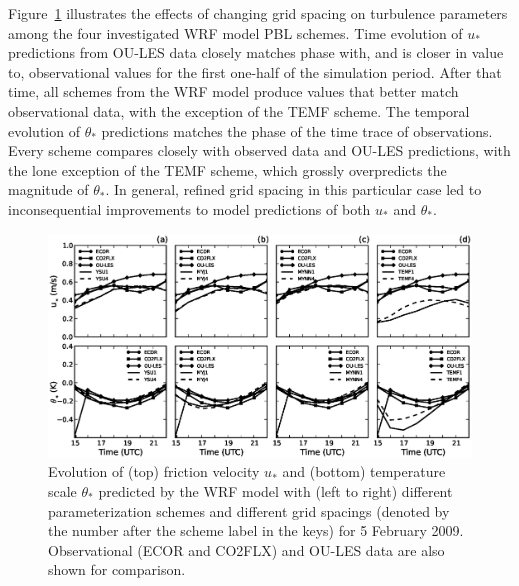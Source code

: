 Figure~\ref{figure429} illustrates the effects of changing grid spacing on turbulence parameters among the four investigated WRF model PBL schemes. Time evolution of $u_*$ predictions from OU-LES data closely matches phase with, and is closer in value to, observational values for the first one-half of the simulation period. After that time, all schemes from the WRF model produce values that better match observational data, with the exception of the TEMF scheme. The temporal evolution of $\theta_*$ predictions matches the phase of the time trace of observations. Every scheme compares closely with observed data and OU-LES predictions, with the lone exception of the TEMF scheme, which grossly overpredicts the magnitude of $\theta_*$. In general, refined grid spacing in this particular case led to inconsequential improvements to model predictions of both $u_*$ and $\theta_*$. 


\begin{figure}[ht!]
\begin{center}
\includegraphics[width=\textwidth]{figures/chapter4/ust_tst_grid_20090205}
\end{center}
\caption{Evolution of (top) friction velocity $u_*$ and (bottom) temperature scale $\theta_*$ predicted by the WRF model with (left to right) different parameterization schemes and different grid spacings (denoted by the number after the scheme label in the keys) for 5 February 2009. Observational (ECOR and CO2FLX) and OU-LES data are also shown for comparison.}
\label{figure429}
\end{figure}


